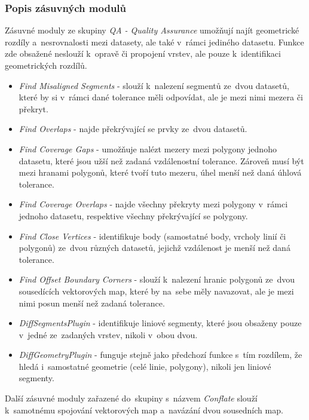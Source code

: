 \subsubsection{Popis zásuvných modulů}
\label{jcs-plugin}

Zásuvné moduly ze skupiny \textit{QA - Quality Assurance} umožňují najít
geometrické rozdíly a~nesrovnalosti mezi datasety, ale také v~rámci jediného
datasetu. Funkce zde obsažené neslouží k~opravě či propojení vrstev, ale 
pouze k~identifikaci geometrických rozdílů.

\begin{itemize}
 \item \textit{Find Misaligned Segments} - slouží k~nalezení segmentů 
    ze~dvou datasetů, které by si v~rámci dané tolerance měli odpovídat,
    ale je mezi nimi mezera či překryt. 
 \item \textit{Find Overlaps} - najde překrývající se prvky ze~dvou datasetů.
 \item \textit{Find Coverage Gaps} - umožňuje nalézt mezery mezi polygony
    jednoho datasetu, které jsou užší než zadaná vzdálenostní tolerance.
    Zároveň musí být mezi hranami polygonů, které tvoří tuto mezeru, úhel menší
    než daná úhlová tolerance.
 \item \textit{Find Coverage Overlaps} - najde všechny překryty mezi polygony
    v~rámci jednoho datasetu, respektive všechny překrývající se polygony.
 \item \textit{Find Close Vertices} - identifikuje body (samostatné body,
    vrcholy linií či polygonů) ze~dvou různých datasetů, jejichž vzdálenost
    je menší než daná tolerance.
 \item \textit{Find Offset Boundary Corners} - slouží k~nalezení hranic
    polygonů ze~dvou sou\-sedících vektorových map, které by na~sebe měly
    navazovat, ale je mezi nimi posun menší než zadaná tolerance.
 \item \textit{DiffSegmentsPlugin} - identifikuje liniové segmenty, které
    jsou obsaženy pouze v~jedné ze~zadaných vrstev, nikoli v~obou dvou.
 \item \textit{DiffGeometryPlugin} - funguje stejně jako předchozí funkce
    s~tím rozdílem, že hledá i~samostatné geometrie (celé linie, polygony),
    nikoli jen liniové segmenty.
\end{itemize}

Další zásuvné moduly zařazené do~skupiny s~názvem \textit{Conflate} slouží
k~samo\-tnému spojování vektorových map a~navázání dvou sousedních map.

